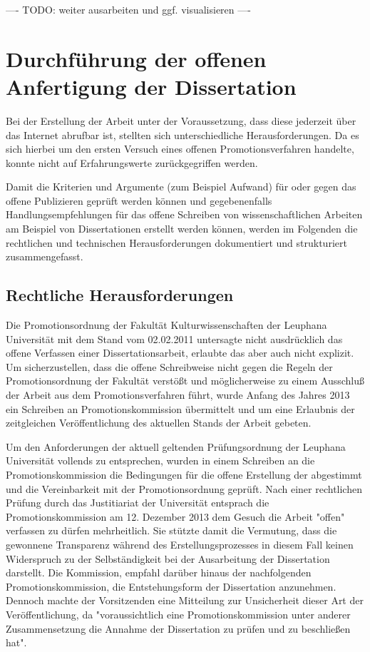 ---- TODO: weiter ausarbeiten und ggf. visualisieren ----

\section{Durchführung der offenen Anfertigung der Dissertation}

Bei der Erstellung der Arbeit unter der Voraussetzung, dass diese jederzeit über das Internet abrufbar ist, stellten sich unterschiedliche Herausforderungen. Da es sich hierbei um den ersten Versuch eines offenen Promotionsverfahren handelte, konnte nicht auf Erfahrungswerte zurückgegriffen werden.

Damit die Kriterien und Argumente (zum Beispiel Aufwand) für oder gegen das offene Publizieren geprüft werden können und gegebenenfalls Handlungsempfehlungen für das offene Schreiben von wissenschaftlichen Arbeiten am Beispiel von Dissertationen erstellt werden können, werden im Folgenden die rechtlichen und technischen Herausforderungen dokumentiert und strukturiert zusammengefasst.

\subsection{Rechtliche Herausforderungen}

Die Promotionsordnung der Fakultät Kulturwissenschaften der Leuphana Universität mit dem Stand vom 02.02.2011 \cite{promotionsordnung_leuphana_kuwi_2011} untersagte nicht ausdrücklich das offene Verfassen einer Dissertationsarbeit, erlaubte das aber auch nicht explizit. Um sicherzustellen, dass die offene Schreibweise nicht gegen die Regeln der Promotionsordnung der Fakultät verstößt und möglicherweise zu einem Ausschluß der Arbeit aus dem Promotionsverfahren führt, wurde Anfang des Jahres 2013 ein Schreiben an Promotionskommission übermittelt und um eine Erlaubnis der zeitgleichen Veröffentlichung des aktuellen Stands der Arbeit gebeten.

Um den Anforderungen der aktuell geltenden Prüfungsordnung der Leuphana Universität vollends zu entsprechen, wurden in einem Schreiben an die Promotionskommission die Bedingungen für die offene Erstellung der abgestimmt und die Vereinbarkeit mit der Promotionsordnung geprüft. Nach einer rechtlichen Prüfung durch das Justitiariat der Universität entsprach die Promotionskommission am 12. Dezember 2013 dem Gesuch die Arbeit "offen" verfassen zu dürfen mehrheitlich. Sie stützte damit die Vermutung, dass die gewonnene Transparenz während des Erstellungsprozesses in diesem Fall keinen Widerspruch zu der Selbständigkeit bei der Ausarbeitung der Dissertation darstellt. Die Kommission, empfahl darüber hinaus der nachfolgenden Promotionskommission, die Entstehungsform der Dissertation anzunehmen. Dennoch machte der Vorsitzenden eine Mitteilung zur Unsicherheit dieser Art der Veröffentlichung, da "voraussichtlich eine Promotionskommission unter anderer Zusammensetzung die Annahme der Dissertation zu prüfen und zu beschließen hat".

